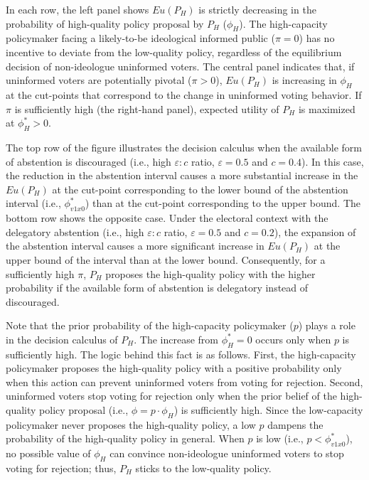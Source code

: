 \documentclass[doc,natbib,12pt]{apa6}
\begin{document}
	\par In each row, the left panel shows $Eu(P_H)$ is strictly decreasing in the probability of high-quality policy proposal by $P_H$ ($\phi_H$). The high-capacity policymaker facing a likely-to-be ideological informed public ($\pi=0$) has no incentive to deviate from the low-quality policy, regardless of the equilibrium decision of non-ideologue uninformed voters. The central panel indicates that, if uninformed voters are potentially pivotal ($\pi>0$), $Eu(P_H)$ is increasing in $\phi_H$ at the cut-points that correspond to the change in uninformed voting behavior. If $\pi$ is sufficiently high (the right-hand panel), expected utility of $P_H$ is maximized at $\phi^*_H>0$.
	
	\par The top row of the figure illustrates the decision calculus when the available form of abstention is discouraged (i.e., high $\varepsilon:c$ ratio, $\varepsilon=0.5$ and $c=0.4$). In this case, the reduction in the abstention interval causes a more substantial increase in the $Eu(P_H)$ at the cut-point corresponding to the lower bound of the abstention interval (i.e., $\phi^*_{v1x0}$) than at the cut-point corresponding to the upper bound. The bottom row shows the opposite case. Under the electoral context with the delegatory abstention (i.e., high $\varepsilon:c$ ratio, $\varepsilon=0.5$ and $c=0.2$), the expansion of the abstention interval causes a more significant increase in $Eu(P_H)$ at the upper bound of the interval than at the lower bound. Consequently, for a sufficiently high $\pi$, $P_H$ proposes the high-quality policy with the higher probability if the available form of abstention is delegatory instead of discouraged.
	
	\par Note that the prior probability of the high-capacity policymaker ($p$) plays a role in the decision calculus of $P_H$. The increase from $\phi^*_H=0$ occurs only when $p$ is sufficiently high. The logic behind this fact is as follows. First, the high-capacity policymaker proposes the high-quality policy with a positive probability only when this action can prevent uninformed voters from voting for rejection. Second, uninformed voters stop voting for rejection only when the prior belief of the high-quality policy proposal (i.e., $\phi = p \cdot \phi_H$) is sufficiently high. Since the low-capacity policymaker never proposes the high-quality policy, a low $p$ dampens the probability of the high-quality policy in general. When $p$ is low (i.e., $p < \phi^*_{v1x0}$), no possible value of $\phi_H$ can convince non-ideologue uninformed voters to stop voting for rejection; thus, $P_H$ sticks to the low-quality policy.
	
\end{document}
